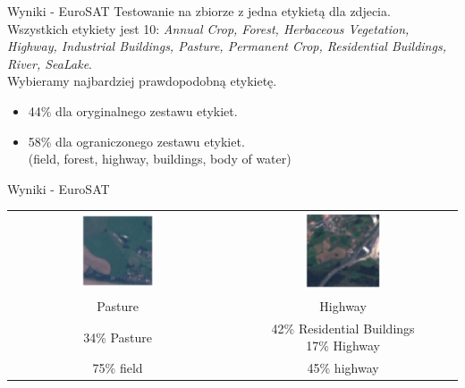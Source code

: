 \documentclass{beamer}
\begin{document}
\begin{frame}{Wyniki - EuroSAT}
  Testowanie na zbiorze z jedna etykietą dla zdjecia. \\[1em]
  Wszystkich etykiety jest 10: \textit{ Annual Crop, Forest, Herbaceous Vegetation, Highway, Industrial Buildings, Pasture, Permanent Crop, Residential Buildings, River, SeaLake}. \\[1em]
  Wybieramy najbardziej prawdopodobną etykietę.\\[1em]
  \begin{itemize}
    \item 44\% dla oryginalnego zestawu etykiet.
    \item 58\% dla ograniczonego zestawu etykiet.\\
      (field, forest, highway, buildings, body of water)
  \end{itemize}
\end{frame}

\begin{frame}{Wyniki - EuroSAT}
  \begin{table}[h]
    \centering
    \small
    \begin{tabular}{cc}
      \includegraphics[width=0.35\textwidth]{../img/eurosat_1.png} & \includegraphics[width=0.35\textwidth]{../img/eurosat_2.png}  \\
      Pasture &  Highway \\ [1em]
      34\% Pasture & \makecell{42\% Residential Buildings \\ 17\% Highway}  \\ \hline
      75\% field & 45\% highway
    \end{tabular}
  \end{table}
\end{frame}
\end{document}
